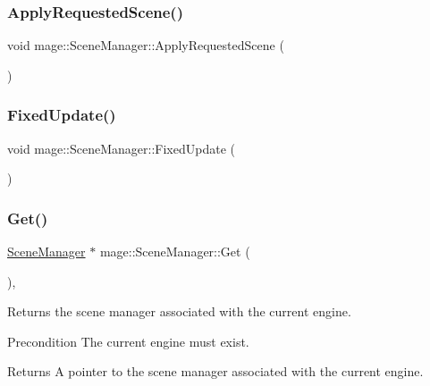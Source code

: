 \subsubsection{\texorpdfstring{Apply\+Requested\+Scene()}{ApplyRequestedScene()}}
{\footnotesize\ttfamily void mage\+::\+Scene\+Manager\+::\+Apply\+Requested\+Scene (\begin{DoxyParamCaption}{ }\end{DoxyParamCaption})\hspace{0.3cm}{\ttfamily [private]}}

\hypertarget{classmage_1_1_scene_manager_a6d97c0fb7945aeb53ec950e62567c1f4}{}\label{classmage_1_1_scene_manager_a6d97c0fb7945aeb53ec950e62567c1f4} 
\subsubsection{\texorpdfstring{Fixed\+Update()}{FixedUpdate()}}
{\footnotesize\ttfamily void mage\+::\+Scene\+Manager\+::\+Fixed\+Update (\begin{DoxyParamCaption}{ }\end{DoxyParamCaption})}

\hypertarget{classmage_1_1_scene_manager_a282dbbea100d7de48c0b0876619db5e7}{}\label{classmage_1_1_scene_manager_a282dbbea100d7de48c0b0876619db5e7} 
\subsubsection{\texorpdfstring{Get()}{Get()}}
{\footnotesize\ttfamily \hyperlink{classmage_1_1_scene_manager}{Scene\+Manager} $\ast$ mage\+::\+Scene\+Manager\+::\+Get (\begin{DoxyParamCaption}{ }\end{DoxyParamCaption})\hspace{0.3cm}{\ttfamily [static]}, {\ttfamily [noexcept]}}

Returns the scene manager associated with the current engine.

\begin{DoxyPrecond}{Precondition}
The current engine must exist. 
\end{DoxyPrecond}
\begin{DoxyReturn}{Returns}
A pointer to the scene manager associated with the current engine. 
\end{DoxyReturn}
\hypertarget{classmage_1_1_scene_manager_a0d2c95558b2217a490527038a668338c}{}\label{classmage_1_1_scene_manager_a0d2c95558b2217a490527038a668338c} 
